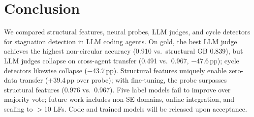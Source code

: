 \section{Conclusion}
\label{sec:conclusion}

We compared structural features, neural probes, LLM judges, and cycle detectors for stagnation detection in LLM coding agents.
On gold, the best LLM judge achieves the highest non-circular accuracy (0.910 vs.\ structural GB 0.839), but LLM judges collapse on cross-agent transfer (0.491 vs.\ 0.967, $-$47.6\,pp); cycle detectors likewise collapse ($-$43.7\,pp).
Structural features uniquely enable zero-data transfer ($+$39.4\,pp over probe); with fine-tuning, the probe surpasses structural features (0.976 vs.\ 0.967).
Five label models fail to improve over majority vote; future work includes non-SE domains, online integration, and scaling to ${>}$10 LFs.
Code and trained models will be released upon acceptance.
